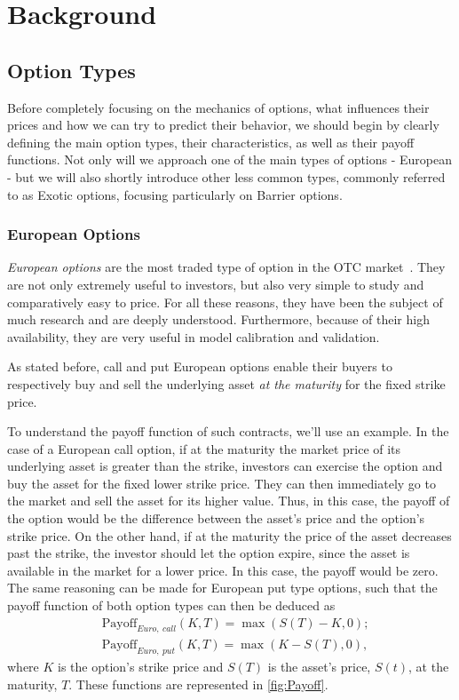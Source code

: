 \chapter{Background}
\label{chapter:background}
\section{Option Types}
Before completely focusing on the mechanics of options, what influences their prices and how we can try to predict their behavior, we should begin by clearly defining the main option types, their characteristics, as well as their payoff functions. Not only will we approach one of the main types of options - European - but we will also shortly introduce other less common types, commonly referred to as Exotic options, focusing particularly on Barrier options.



\subsection{European Options}
\emph{European options} are the most traded type of option in the OTC market~\citep{InvEuro}. They are not only extremely useful to investors, but also very simple to study and comparatively easy to price. For all these reasons, they have been the subject of much research and are deeply understood. Furthermore, because of their high availability, they are very useful in model calibration and validation.


As stated before, call and put European options enable their buyers to respectively buy and sell the underlying asset \emph{at the maturity} for the fixed strike price.

To understand the payoff function of such contracts, we'll use an example. In the case of a European call option, if at the maturity the market price of its underlying asset is greater than the strike, investors can exercise the option and buy the asset for the fixed lower strike price. They can then immediately go to the market and sell the asset for its higher value. Thus, in this case, the payoff of the option would be the difference between the asset's price and the option's strike price. On the other hand, if at the maturity the price of the asset decreases past the strike, the investor should let the option expire, since the asset is available in the market for a lower price. In this case, the payoff would be zero.
The same reasoning can be made for European put type options, such that the payoff function of both option types can then be deduced as
\begin{subequations}\label{callput}
\begin{align}
&\text{Payoff}_{Euro,\ call}(K,T)=\max\left(S(T)-K,0\right);\\
&\text{Payoff}_{Euro,\ put}(K,T)=\max\left(K-S(T),0\right),
\end{align}
\end{subequations}
\noindent where $K$ is the option's strike price and $S(T)$ is the asset's price, $S(t)$, at the maturity, $T$. These functions are represented in \autoref{fig:Payoff}.

